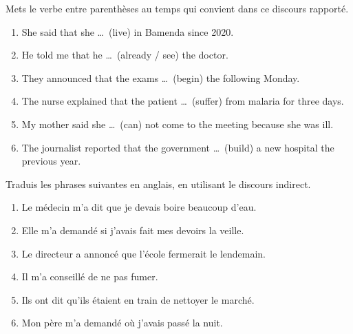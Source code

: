 \documentclass[11pt]{article}
\newcounter{popsec}
\newcounter{popsub}
\newcommand{\courssub}[1]{%
  \stepcounter{popsub}%
  \par\vspace{9pt}\noindent{\popxbold\fontsize{11.5}{13}\selectfont\color{popink}{\color{poporange}\thepopsec.\thepopsub}\hspace{6pt}#1}\par\nopagebreak\vspace{4pt}
}
\begin{document}
\begin{exercice}
Mets le verbe entre parenthèses au temps qui convient dans ce discours rapporté.
\begin{enumerate}
\item She said that she \ldots\ (live) in Bamenda since 2020.
\item He told me that he \ldots\ (already / see) the doctor.
\item They announced that the exams \ldots\ (begin) the following Monday.
\item The nurse explained that the patient \ldots\ (suffer) from malaria for three days.
\item My mother said she \ldots\ (can) not come to the meeting because she was ill.
\item The journalist reported that the government \ldots\ (build) a new hospital the previous year.
\end{enumerate}
\end{exercice}

\courssub{Je m'entraîne}

\begin{exercice}[Traduction]
Traduis les phrases suivantes en anglais, en utilisant le discours indirect.
\begin{enumerate}
\item Le médecin m'a dit que je devais boire beaucoup d'eau.
\item Elle m'a demandé si j'avais fait mes devoirs la veille.
\item Le directeur a annoncé que l'école fermerait le lendemain.
\item Il m'a conseillé de ne pas fumer.
\item Ils ont dit qu'ils étaient en train de nettoyer le marché.
\item Mon père m'a demandé où j'avais passé la nuit.
\end{enumerate}
\end{exercice}
\end{document}
